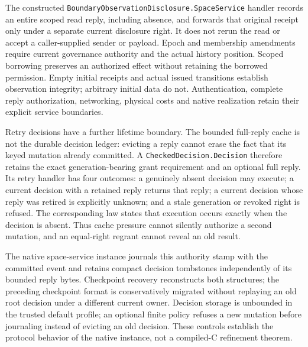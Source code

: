 \documentclass[11pt]{article}
\theoremstyle{definition}
\theoremstyle{remark}
\begin{document}
The constructed \nolinkurl{BoundaryObservationDisclosure.SpaceService}
handler records an entire scoped read reply, including absence, and forwards
that original receipt only under a separate current disclosure right. It
does not rerun the read or accept a caller-supplied sender or payload.
Epoch and membership amendments require current governance authority and the
actual history position. Scoped borrowing preserves an authorized effect
without retaining the borrowed permission. Empty initial receipts and actual
issued transitions establish observation integrity; arbitrary initial data
do not. Authentication, complete reply authorization, networking, physical
costs and native realization retain their explicit service boundaries.

Retry decisions have a further lifetime boundary.  The bounded full-reply
cache is not the durable decision ledger: evicting a reply cannot erase the
fact that its keyed mutation already committed.  A
\nolinkurl{CheckedDecision.Decision} therefore retains the exact
generation-bearing grant requirement and an optional full reply.  Its retry
handler has four outcomes: a genuinely absent decision may execute; a current
decision with a retained reply returns that reply; a current decision whose
reply was retired is explicitly unknown; and a stale generation or revoked
right is refused.  The corresponding law states that execution occurs exactly
when the decision is absent.  Thus cache pressure cannot silently authorize a
second mutation, and an equal-right regrant cannot reveal an old result.

The native space-service instance journals this authority stamp with the
committed event and retains compact decision tombstones independently of its
bounded reply bytes.  Checkpoint recovery reconstructs both structures; the
preceding checkpoint format is conservatively migrated without replaying an
old root decision under a different current owner.  Decision storage is
unbounded in the trusted default profile; an optional finite policy refuses a
new mutation before journaling instead of evicting an old decision.  These
controls establish the protocol behavior of the native instance, not a
compiled-C refinement theorem.
\end{document}
